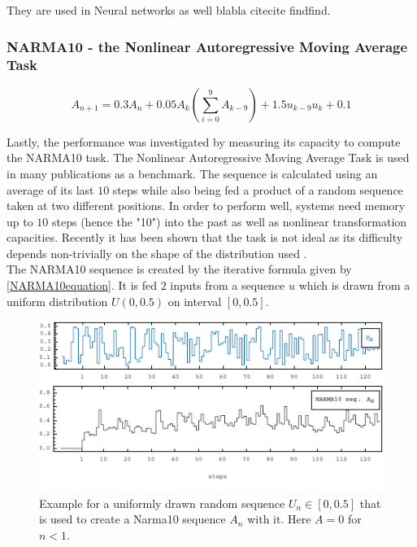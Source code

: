 They are used in Neural networks as well blabla citecite findfind. 
\cite{VOELKER Legendre Memory Units: Continuous-TimeRepresentation in Recurrent Neural Networks}





\subsubsection{NARMA10 - the Nonlinear Autoregressive Moving Average Task}
\begin{equation}
A_{n+1} = 0.3 A_{n} + 0.05 A_{k}\left( \sum_{i=0}^{9} A_{k-9} \right) +1.5 u_{k-9} u_{k} + 0.1
\label{NARMA10equation}
\end{equation}

Lastly, the performance was investigated by measuring its capacity to compute the NARMA10 task. The Nonlinear Autoregressive Moving Average Task \cite{HER12} is used in many publications as a benchmark. The sequence is calculated using an average of its last $10$ steps while also being fed a product of a random sequence taken at two different positions. In order to perform well, systems need memory up to $10$ steps (hence the "10") into the past as well as nonlinear transformation capacities. Recently it has been shown that the task is not ideal as its difficulty depends non-trivially on the shape of the distribution used \cite{KUBOTA_Arxive}. \\
The NARMA10 sequence is created by the iterative formula given by \ref{NARMA10equation}. It is fed $2$ inputs from a sequence $u$ which is drawn from a uniform distribution $U(0,0.5)$ on interval $\left[0,0.5\right]$.



\begin{figure}[h]
	\centering
	\includegraphics[width=13cm]{pics/narma_vis}
	\caption{Example for a uniformly drawn random sequence $U_n \in [0,0.5]$ that is used to create a Narma10 sequence $A_n$ with it. Here $A=0$ for $n<1$.}
	\label{fig:narma_vis}
\end{figure}
	
